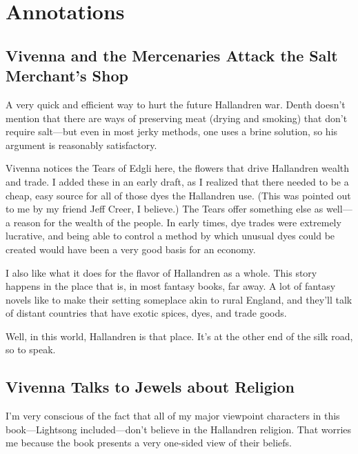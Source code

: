 \section*{Annotations}

\subsection*{Vivenna and the Mercenaries Attack the Salt Merchant’s Shop}

A very quick and efficient way to hurt the future Hallandren war. Denth doesn’t mention that there are ways of preserving meat (drying and smoking) that don’t require salt—but even in most jerky methods, one uses a brine solution, so his argument is reasonably satisfactory.

Vivenna notices the Tears of Edgli here, the flowers that drive Hallandren wealth and trade. I added these in an early draft, as I realized that there needed to be a cheap, easy source for all of those dyes the Hallandren use. (This was pointed out to me by my friend Jeff Creer, I believe.) The Tears offer something else as well—a reason for the wealth of the people. In early times, dye trades were extremely lucrative, and being able to control a method by which unusual dyes could be created would have been a very good basis for an economy.

I also like what it does for the flavor of Hallandren as a whole. This story happens in the place that is, in most fantasy books, far away. A lot of fantasy novels like to make their setting someplace akin to rural England, and they’ll talk of distant countries that have exotic spices, dyes, and trade goods.

Well, in this world, Hallandren is that place. It’s at the other end of the silk road, so to speak.

\subsection*{Vivenna Talks to Jewels about Religion}

I’m very conscious of the fact that all of my major viewpoint characters in this book—Lightsong included—don’t believe in the Hallandren religion. That worries me because the book presents a very one-sided view of their beliefs.

